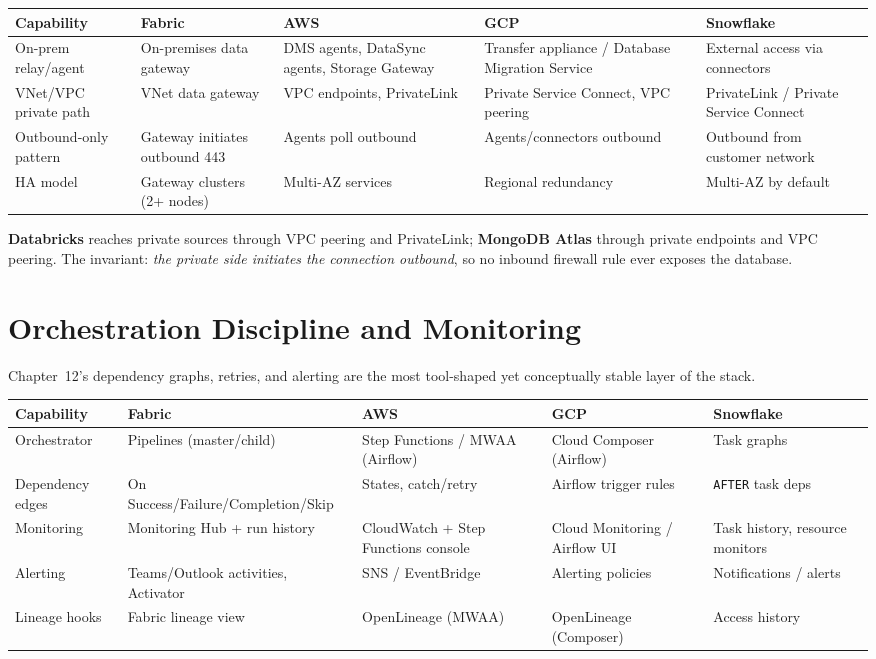 \begin{center}
\footnotesize
\begin{tabular}{@{}p{2.8cm}p{3.2cm}p{3.2cm}p{3.2cm}p{3.2cm}@{}}
\toprule
\textbf{Capability} & \textbf{Fabric} & \textbf{AWS} & \textbf{GCP} & \textbf{Snowflake} \\
\midrule
On-prem relay/agent & On-premises data gateway & DMS agents, DataSync agents, Storage Gateway & Transfer appliance / Database Migration Service & External access via connectors \\
VNet/VPC private path & VNet data gateway & VPC endpoints, PrivateLink & Private Service Connect, VPC peering & PrivateLink / Private Service Connect \\
Outbound-only pattern & Gateway initiates outbound 443 & Agents poll outbound & Agents/connectors outbound & Outbound from customer network \\
HA model & Gateway clusters (2+ nodes) & Multi-AZ services & Regional redundancy & Multi-AZ by default \\
\bottomrule
\end{tabular}
\end{center}

\noindent \textbf{Databricks} reaches private sources through VPC peering and PrivateLink;
\textbf{MongoDB Atlas} through private endpoints and VPC peering. The invariant: \emph{the
private side initiates the connection outbound}, so no inbound firewall rule ever exposes the
database.

\section{Orchestration Discipline and Monitoring}
%
Chapter~12's dependency graphs, retries, and alerting are the most tool-shaped yet conceptually
stable layer of the stack.

\begin{center}
\footnotesize
\begin{tabular}{@{}p{2.8cm}p{3.2cm}p{3.2cm}p{3.2cm}p{3.2cm}@{}}
\toprule
\textbf{Capability} & \textbf{Fabric} & \textbf{AWS} & \textbf{GCP} & \textbf{Snowflake} \\
\midrule
Orchestrator & Pipelines (master/child) & Step Functions / MWAA (Airflow) & Cloud Composer (Airflow) & Task graphs \\
Dependency edges & On Success/Failure/Completion/Skip & States, catch/retry & Airflow trigger rules & \texttt{AFTER} task deps \\
Monitoring & Monitoring Hub + run history & CloudWatch + Step Functions console & Cloud Monitoring / Airflow UI & Task history, resource monitors \\
Alerting & Teams/Outlook activities, Activator & SNS / EventBridge & Alerting policies & Notifications / alerts \\
Lineage hooks & Fabric lineage view & OpenLineage (MWAA) & OpenLineage (Composer) & Access history \\
\bottomrule
\end{tabular}
\end{center}

